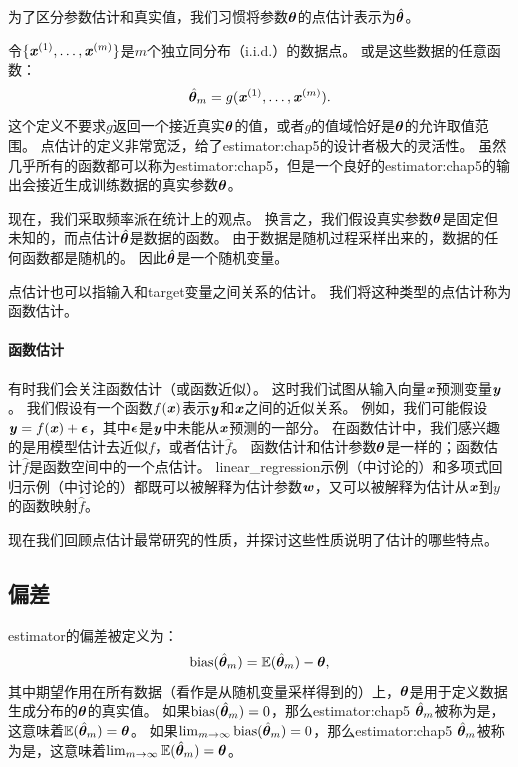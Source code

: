 为了区分参数估计和真实值，我们习惯将参数$\boldsymbol{\theta}$的点估计表示为$\hat{\boldsymbol{\theta}}$。

令$\{\boldsymbol{\mathit{x}}^{(1)},\dots,\boldsymbol{\mathit{x}}^{(m)}\}$是$m$个独立同分布（i.i.d.）的数据点。
或是这些数据的任意函数：
\begin{equation}
    \hat{\boldsymbol{\theta}}_m = g(\boldsymbol{\mathit{x}}^{(1)}, \dots, \boldsymbol{\mathit{x}}^{(m)}) .
\end{equation}
这个定义不要求$g$返回一个接近真实$\boldsymbol{\theta}$的值，或者$g$的值域恰好是$\boldsymbol{\theta}$的允许取值范围。
点估计的定义非常宽泛，给了\gls{estimator:chap5}的设计者极大的灵活性。
虽然几乎所有的函数都可以称为\gls{estimator:chap5}，但是一个良好的\gls{estimator:chap5}的输出会接近生成训练数据的真实参数$\boldsymbol{\theta}$。


现在，我们采取频率派在统计上的观点。
换言之，我们假设真实参数$\boldsymbol{\theta}$是固定但未知的，而点估计$\hat{\boldsymbol{\theta}}$是数据的函数。
由于数据是随机过程采样出来的，数据的任何函数都是随机的。
因此$\hat{\boldsymbol{\theta}}$是一个随机变量。


点估计也可以指输入和\gls{target}变量之间关系的估计。
我们将这种类型的点估计称为函数估计。

\paragraph{函数估计} 有时我们会关注函数估计（或函数近似）。
这时我们试图从输入向量$\boldsymbol{\mathit{x}}$预测变量$\boldsymbol{\mathit{y}}$。
我们假设有一个函数$f(\boldsymbol{\mathit{x}})$表示$\boldsymbol{\mathit{y}}$和$\boldsymbol{\mathit{x}}$之间的近似关系。
例如，我们可能假设$\boldsymbol{\mathit{y}} = f(\boldsymbol{\mathit{x}}) + \boldsymbol{\epsilon}$，其中$\boldsymbol{\epsilon}$是$\boldsymbol{\mathit{y}}$中未能从$\boldsymbol{\mathit{x}}$预测的一部分。
在函数估计中，我们感兴趣的是用模型估计去近似$f$，或者估计$\hat{f}$。
函数估计和估计参数$\boldsymbol{\theta}$是一样的；函数估计$\hat{f}$是函数空间中的一个点估计。
\gls{linear_regression}示例（中讨论的）和多项式回归示例（中讨论的）都既可以被解释为估计参数$\boldsymbol{\mathit{w}}$，又可以被解释为估计从$\boldsymbol{\mathit{x}}$到$y$的函数映射$\hat{f}$。

现在我们回顾点估计最常研究的性质，并探讨这些性质说明了估计的哪些特点。

\subsection{偏差}
\label{sec:bias}
\gls{estimator}的偏差被定义为：
\begin{equation}
\label{eq:5.20}
    \text{bias}(\hat{\boldsymbol{\theta}}_m) = \mathbb{E}(\hat{\boldsymbol{\theta}}_m) - \boldsymbol{\theta},
\end{equation}
其中期望作用在所有数据（看作是从随机变量采样得到的）上，$\boldsymbol{\theta}$是用于定义数据生成分布的$\boldsymbol{\theta}$的真实值。
如果$\text{bias}(\hat{\boldsymbol{\theta}}_m)=0$，那么\gls{estimator:chap5} $\hat{\boldsymbol{\theta}}_m$被称为是，这意味着$\mathbb{E}(\hat{\boldsymbol{\theta}}_m) = \boldsymbol{\theta}$。
如果$\lim_{m\to\infty} \text{bias}(\hat{\boldsymbol{\theta}}_m)=0$，那么\gls{estimator:chap5} $\hat{\boldsymbol{\theta}}_m$被称为是，这意味着$\lim_{m\to\infty} \mathbb{E}(\hat{\boldsymbol{\theta}}_m) = \boldsymbol{\theta}$。

